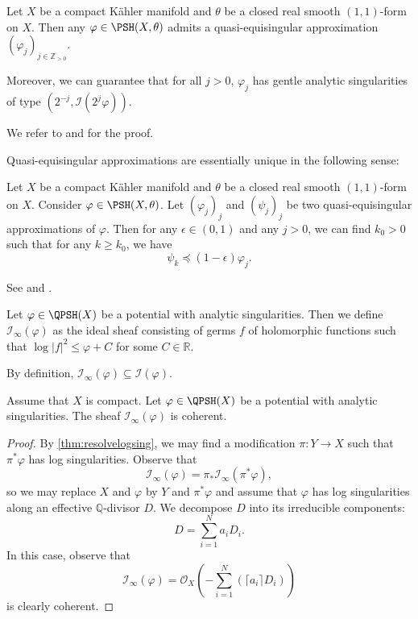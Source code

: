 \begin{theorem}\label{thm:qequi}
    Let $X$ be a compact Kähler manifold and $\theta$ be a closed real smooth $(1,1)$-form on $X$. Then any $\varphi\in \PSH(X,\theta)$ admits a quasi-equisingular approximation $(\varphi_j)_{j\in \mathbb{Z}_{>0}}$.

    Moreover, we can guarantee that for all $j>0$, $\varphi_j$ has gentle analytic singularities of type $\left(2^{-j},\mathcal{I}(2^j\varphi)\right)$.
\end{theorem}
We refer to \cite{Dem92reg, DPS01} and \cite[Theorem~13.4.5]{FPT} for the proof.

Quasi-equisingular approximations are essentially unique in the following sense:
\begin{proposition}\label{prop:compqequi}
    Let $X$ be a compact Kähler manifold and $\theta$ be a closed real smooth $(1,1)$-form on $X$. Consider $\varphi\in \PSH(X,\theta)$. Let $(\varphi_j)_j$ and $(\psi_j)_j$ be two quasi-equisingular approximations of $\varphi$. Then for any $\epsilon\in (0,1)$ and any $j>0$, we can find $k_0>0$ such that for any $k\geq k_0$, we have
    \[
        \psi_k\preceq (1-\epsilon)\varphi_j.
    \]
\end{proposition}
See \cite[Corollary~4.1.7]{Dem15} and \cite[Proposition~13.5.2]{FPT}.


\begin{definition}\label{def:Iinfty}
    Let $\varphi\in \QPSH(X)$ be a potential with analytic singularities. Then we define $\mathcal{I}_{\infty}(\varphi)$  as the ideal sheaf consisting of germs $f$ of holomorphic functions such that $\log |f|^2\leq \varphi+C$ for some $C\in \mathbb{R}$.
\end{definition}
By definition, $\mathcal{I}_{\infty}(\varphi)\subseteq \mathcal{I}(\varphi)$.

\begin{lemma}\label{lma:pshfunctions:L1494}
    Assume that $X$ is compact. Let $\varphi\in \QPSH(X)$ be a potential with analytic singularities.
    The sheaf $\mathcal{I}_{\infty}(\varphi)$ is coherent.
\end{lemma}
\begin{proof}
    By \cref{thm:resolvelogsing}, we may find a modification $\pi\colon Y\rightarrow X$ such that $\pi^*\varphi$ has log singularities. Observe that
    \[
        \mathcal{I}_{\infty}(\varphi)=\pi_*\mathcal{I}_{\infty}(\pi^*\varphi),
    \]
    so we may replace $X$ and $\varphi$ by $Y$ and $\pi^*\varphi$ and assume that $\varphi$ has log singularities along an effective $\mathbb{Q}$-divisor $D$. We decompose $D$ into its irreducible components:
    \[
        D=\sum_{i=1}^N a_iD_i.
    \]
    In this case, observe that
    \[
        \mathcal{I}_{\infty}(\varphi)=\mathcal{O}_X\left(-\sum_{i=1}^N\left(\lceil a_i \rceil D_i\right)\right)
    \]
    is clearly coherent.
\end{proof}

